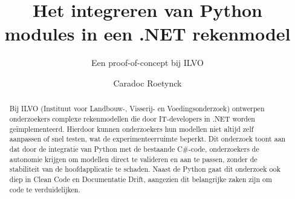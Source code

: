\documentclass[a0,portrait]{hogent-poster}
\title{Het integreren van Python modules in een .NET rekenmodel}
\subtitle{Een proof-of-concept bij ILVO}
\author{Caradoc Roetynck}
\begin{document}
\maketitle

\begin{abstract}
  Bij ILVO (Instituut voor Landbouw-, Visserij- en Voedingsonderzoek) ontwerpen onderzoekers complexe rekenmodellen die door IT-developers in .NET worden geïmplementeerd. 
  Hierdoor kunnen onderzoekers hun modellen niet altijd zelf aanpassen of snel testen, wat de experimenteerruimte beperkt. 
  Dit onderzoek toont aan dat door de integratie van Python met de bestaande C\#-code, onderzoekers de autonomie krijgen om modellen direct te valideren en aan te passen, zonder de stabiliteit van de hoofdapplicatie te schaden.
  Naast de Python gaat dit onderzoek ook diep in Clean Code en Documentatie Drift, aangezien dit belangrijke zaken zijn om code te verduidelijken.
\end{abstract}
\end{document}
